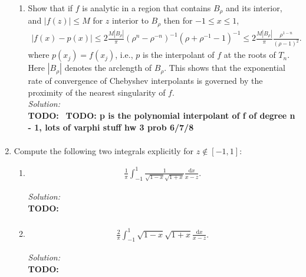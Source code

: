 \documentclass[10pt]{amsart}
\newcommand{\D}{\mathrm{d}}
\theoremstyle{nonumberplain}
\begin{document}
\begin{enumerate}[label={\bf {\arabic*}:}]
\begin{enumerate}
\item Show that if $f$ is analytic in a region that contains $B_\rho$ and its interior, and $|f(z)| \leq M$ for $z$ interior to $B_\rho$ then for $-1 \leq x \leq 1$,
\begin{align*}
|f(x) - p(x)| \leq 2 \frac{M | B_\rho| }{\pi}  (\rho^n - \rho^{-n})^{-1} (\rho + \rho^{-1} - 1)^{-1} \leq 2 \frac{M | B_\rho| }{\pi} \frac{\rho^{1-n}}{(\rho - 1)^2}.
\end{align*}
where $p(x_j) = f(x_j)$, i.e., $p$ is the interpolant of $f$ at the roots of $T_n$. 
Here $|B_\rho|$ denotes the arclength of $B_\rho$.  This shows that the exponential rate of convergence of Chebyshev interpolants is governed by the proximity of the nearest singularity of $f$. \\

\noindent
\textit{Solution:} \\
\textbf{TODO:} \
\textbf{TODO: p is the polynomial interpolant of f of degree n - 1, lots of varphi stuff hw 3 prob 6/7/8}
\begin{align*}
\end{align*}
      
\end{enumerate}
\newpage


\item Compute the following two integrals explicitly for $ z \not \in [-1,1]$:
\begin{enumerate}
\item
\begin{align*}
\frac{1}{\pi}\int_{-1}^1 \frac{1}{\sqrt{1-x} \sqrt{1 + x}} \frac{\D x}{x -z}.
\end{align*}

\textit{Solution:} \\
\textbf{TODO:}
\begin{align*}
\end{align*}

\item 
\begin{align*}
\frac{2}{\pi}\int_{-1}^1 {\sqrt{1-x} \sqrt{1 + x}}
\frac{\D x}{x -z}.
\end{align*}

\textit{Solution:} \\
\textbf{TODO:}
\begin{align*}
\end{align*}


\end{enumerate}

      
    


  
\end{enumerate}
\end{document}
